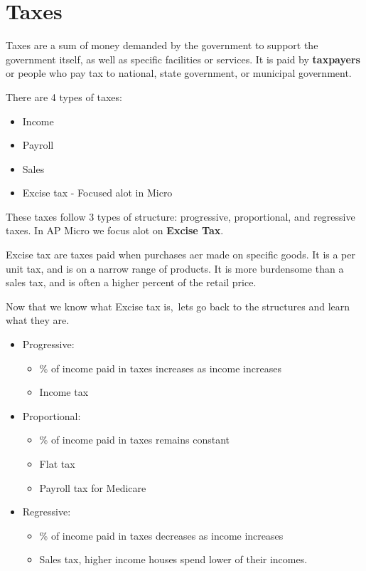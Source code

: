 \section{Taxes}
\begin{definition}
    Taxes are a sum of money demanded by the government to support the government itself, as well as specific facilities or services. It is paid by \textbf{taxpayers} or people who pay tax to national, state government, or municipal government.
\end{definition}
There are 4 types of taxes:
\begin{itemize}
    \item Income
    \item Payroll
    \item Sales
    \item Excise tax - Focused alot in Micro
\end{itemize}
 These taxes follow 3 types of structure: progressive, proportional, and regressive taxes. In AP Micro we focus alot on \textbf{Excise Tax}.
 \begin{definition}
     Excise tax are taxes paid when purchases aer made on specific goods. It is a per unit tax, and is on a narrow range of products. It is more burdensome than a sales tax, and is often a higher percent of the retail price. 
 \end{definition}

 Now that we know what Excise tax is, lets go back to the structures and learn what they are.
 \begin{itemize}
     \item Progressive:
         \begin{itemize}
             \item \% of income paid in taxes increases as income increases
             \item Income tax
         \end{itemize}
     \item Proportional: 
         \begin{itemize}
             \item \% of income paid in taxes remains constant
             \item Flat tax
             \item Payroll tax for Medicare
         \end{itemize}
     \item Regressive:
         \begin{itemize}
             \item \% of income paid in taxes decreases as income increases
             \item Sales tax, higher income houses spend lower of their incomes. 
         \end{itemize}
 \end{itemize}

